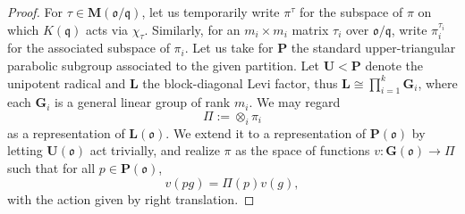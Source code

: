 \documentclass[reqno]{amsart}
\theoremstyle{plain} \newtheorem{theorem} {Theorem} \newtheorem{conjecture} {Conjecture} \newtheorem{corollary} [theorem] {Corollary} \newtheorem{proposition} [theorem] {Proposition} \newtheorem{fact} [theorem] {Fact}
\theoremstyle{definition} \newtheorem{definition} [theorem] {Definition}
\theoremstyle{itplain} %
\newcommand{\mfq}{\mathfrak{q}}
\begin{document}
\begin{proof}
  For $\tau \in \mathbf{M}(\mathfrak{o}/\mfq)$, let us temporarily write $\pi^{\tau}$ for the subspace of $\pi$ on which $K(\mfq)$ acts via $\chi_\tau$.  Similarly, for an $m_i \times m_i$ matrix $\tau_i$ over $\mathfrak{o}/\mfq$, write $\pi_i^{\tau_i}$ for the associated subspace of $\pi_i$.  Let us take for $\mathbf{P}$ the standard upper-triangular parabolic subgroup associated to the given partition.  Let $\mathbf{U} < \mathbf{P}$ denote the unipotent radical and $\mathbf{L}$ the block-diagonal Levi factor, thus $\mathbf{L} \cong \prod_{i=1}^k \mathbf{G}_i$, where each $\mathbf{G}_i$ is a general linear group of rank $m_i$.  We may regard
  \begin{equation*}
    \Pi := \otimes_i \pi_i
  \end{equation*}
  as a representation of $\mathbf{L}(\mathfrak{o})$.  We extend it to a representation of $\mathbf{P}(\mathfrak{o})$ by letting $\mathbf{U}(\mathfrak{o})$ act trivially, and realize $\pi$ as the space of functions $v : \mathbf{G}(\mathfrak{o}) \rightarrow \Pi$ such that for all $p \in \mathbf{P}(\mathfrak{o})$,
  \begin{equation*}
    v(p g) = \Pi(p) v(g),
  \end{equation*}
  with the action given by right translation.


\end{proof}
\end{document}
